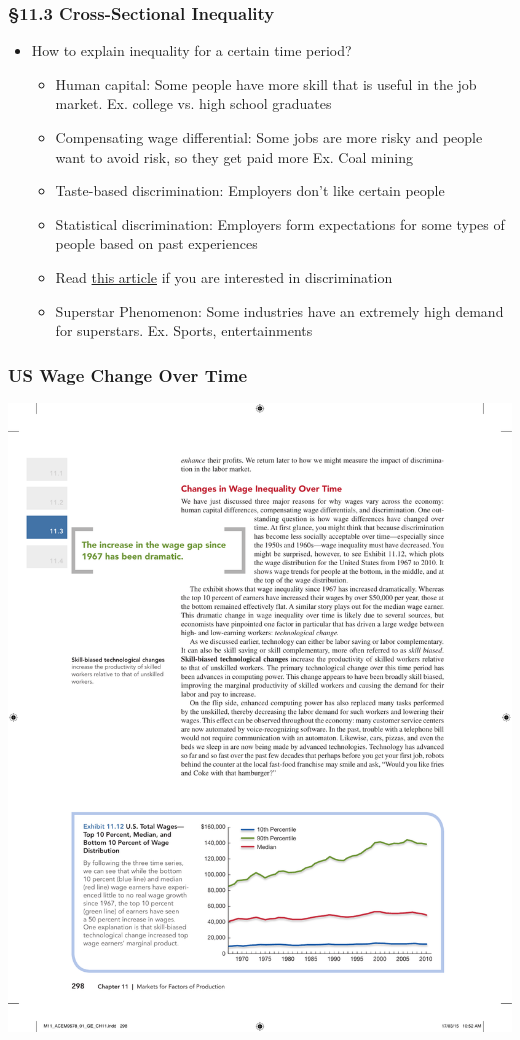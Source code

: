 \documentclass[12pt, xcolor=dvipsnames]{beamer}
\begin{document}
\begin{frame}
\frametitle{\bf §11.3 Cross-Sectional Inequality}
\begin{itemize}
\item How to explain inequality for a certain time period?
\begin{itemize}
\item Human capital: Some people have more skill that is useful in the job market. Ex. college vs. high school graduates
\item Compensating wage differential: Some jobs are more risky and people want to avoid risk, so they get paid more Ex. Coal mining
\item Taste-based discrimination: Employers don't like certain people
\item Statistical discrimination: Employers form expectations for some types of people based on past experiences
\item Read \href{http://talkecon.com/discrimination/}{this article} if you are interested in discrimination
\item Superstar Phenomenon: Some industries have an extremely high demand for superstars. Ex. Sports, entertainments
\end{itemize}
\end{itemize}
\end{frame}



\begin{frame}
\frametitle{\bf US Wage Change Over Time}
\begin{center}
\includegraphics[width=\linewidth]{figures/1.pdf}
\end{center}
\end{frame}
\end{document}
